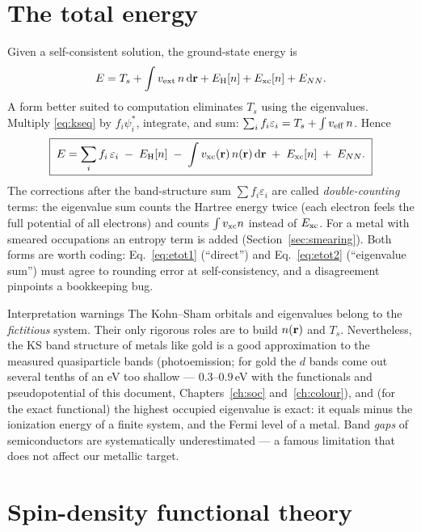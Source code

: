 \section{The total energy}

Given a self-consistent solution, the ground-state energy is
\begin{equation}
E = T_s + \int v_{\mathrm{ext}}\, n\, \mathrm{d}\mathbf{r} + E_{\mathrm H}[n] + E_{\mathrm{xc}}[n] + E_{NN}.
\label{eq:etot1}
\end{equation}
A form better suited to computation eliminates $T_s$ using the eigenvalues.
Multiply \eqref{eq:kseq} by $f_i\psi_i^*$, integrate, and sum:
$\sum_i f_i \varepsilon_i = T_s + \int v_{\mathrm{eff}}\, n$. Hence
\begin{equation}
\boxed{\;
E = \sum_i f_i\,\varepsilon_i
\;-\; E_{\mathrm H}[n]
\;-\; \int v_{\mathrm{xc}}(\mathbf{r})\, n(\mathbf{r})\, \mathrm{d}\mathbf{r}
\;+\; E_{\mathrm{xc}}[n]
\;+\; E_{NN}.
\;}
\label{eq:etot2}
\end{equation}
The corrections after the band-structure sum $\sum f_i\varepsilon_i$ are
called \emph{double-counting} terms: the eigenvalue sum counts the Hartree
energy twice (each electron feels the full potential of all electrons) and
counts $\int v_{\mathrm{xc}} n$ instead of $E_{\mathrm{xc}}$. For a metal with smeared occupations
an entropy term is added (Section~\ref{sec:smearing}). Both forms are
worth coding: Eq.~\eqref{eq:etot1} (``direct'') and Eq.~\eqref{eq:etot2}
(``eigenvalue sum'') must agree to rounding error at self-consistency, and
a disagreement pinpoints a bookkeeping bug.

\begin{keybox}{Interpretation warnings}
The Kohn--Sham orbitals and eigenvalues belong to the \emph{fictitious}
system. Their only rigorous roles are to build $n(\mathbf{r})$ and $T_s$.
Nevertheless, the KS band structure of metals like gold is a good
approximation to the measured quasiparticle bands (photoemission; for gold
the $d$ bands come out several tenths of an eV too shallow --- $0.3$--$0.9$\,eV
with the functionals and pseudopotential of this document,
Chapters~\ref{ch:soc} and~\ref{ch:colour}), and
(for the exact functional) the highest occupied eigenvalue is exact: it
equals minus the ionization energy of a finite system, and the Fermi level
of a metal. Band
\emph{gaps} of semiconductors are systematically underestimated --- a famous
limitation that does not affect our metallic target.
\end{keybox}

\section{Spin-density functional theory}

